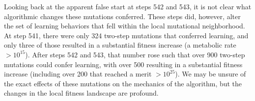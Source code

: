 Looking back at the apparent false start at steps 542 and 543, it is not clear what algorithmic changes these mutations conferred.
These steps did, however, alter the set of learning behaviors that fell within the local mutational neighborhood. 
At step 541, there were only 324 two-step mutations that conferred learning, and only three of those resulted in a substantial fitness increase (a metabolic rate $> 10^{15}$). %
After steps 542 and 543, that number rose such that over 900 two-step mutations could confer learning, with over 500 resulting in a substantial fitness increase (including over 200 that reached a merit $> 10^{25}$).
We may be unsure of the exact effects of these mutations on the mechanics of the algorithm, but the changes in the local fitness landscape are profound. %
